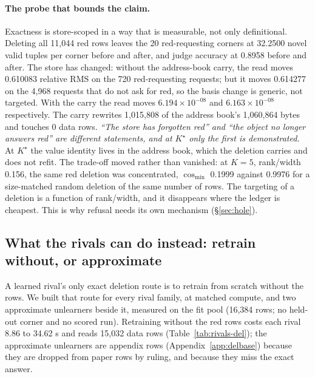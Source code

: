 \documentclass{article} %
\newcommand{\sci}[2]{\ensuremath{#1\times10^{#2}}}
\newcommand{\Kstar}{\ensuremath{K^{\star}}}
\begin{document}
\paragraph{The probe that bounds the claim.} Exactness is store-scoped in a way that is
measurable, not only definitional. Deleting all 11,044 red rows leaves the 20 red-requesting
corners at 32.2500 novel valid tuples per corner before and after, and judge accuracy at
0.8958 before and after. %
The store has changed: without the address-book carry, the read moves 0.610083 relative RMS on
the 720 red-requesting requests; but it moves 0.614277 on the 4,968 requests that do not ask
for red, so the basis change is generic, not targeted. With the carry the read moves
\sci{6.194}{-08} and \sci{6.163}{-08} respectively. The carry rewrites 1,015,808 of the
address book's 1,060,864 bytes and touches 0 data rows. %
\emph{``The store has forgotten red'' and ``the object no longer answers red'' are different
statements, and at $\Kstar$ only the first is demonstrated.} At $\Kstar$ the value identity
lives in the address book, which the deletion carries and does not refit. The trade-off moved
rather than vanished: at $K=5$, rank/width 0.156, the same red deletion was concentrated,
$\cos_{\min}$ 0.1999 against 0.9976 for a size-matched random deletion of the same number of
rows. %
The targeting of a deletion is a function of rank/width, and it disappears where the ledger is
cheapest. This is why refusal needs its own mechanism (\S\ref{sec:hole}).

\subsection{What the rivals can do instead: retrain without, or approximate}
\label{sec:del-comparators}

A learned rival's only exact deletion route is to retrain from scratch without the rows. We
built that route for every rival family, at matched compute, and two approximate unlearners
beside it, measured on the fit pool (16,384 rows; no held-out corner and no scored run).
Retraining without the red rows costs each rival 8.86 to 34.62 s and reads 15,032 data rows
(Table~\ref{tab:rivals-del}); the approximate unlearners are appendix rows
(Appendix~\ref{app:delbase}) because they are dropped from paper rows by ruling, and because
they miss the exact answer. %
\end{document}
